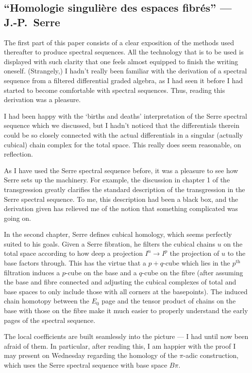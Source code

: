 \documentclass[11pt]{article}
\newcommand{\KanSemResponse}[1]
{
\thispagestyle{fancy}
\subsection*{#1}
}
\begin{document}
\begin{SerreHomSingFibSpace}
\KanSemResponse
{``Homologie singuli\`ere des espaces fibr\'es'' --- J.-P.\ Serre}
The first part of this paper consists of a clear exposition of the methods used thereafter to produce spectral sequences. All the technology that is to be used is displayed with such clarity that one feels almost equipped to finish the writing oneself. (Strangely,) I hadn't really been familiar with the derivation of a spectral sequence from a filtered differential graded algebra, as I had seen it before I had started to become comfortable with spectral sequences. Thus, reading this derivation was a pleasure.

I had been happy with the `births and deaths' interpretation of the Serre spectral sequence which we discussed, but I hadn't noticed that the differentials therein could be so closely connected with the actual differentials in a singular (actually cubical) chain complex for the total space. This really does seem reasonable, on reflection.

As I have used the Serre spectral sequence before, it was a pleasure to see how Serre sets up the machinery. For example, the discussion in chapter 1 of the transgression greatly clarifies the standard description of the transgression in the Serre spectral sequence. To me, this description had been a black box, and the derivation given has relieved me of the notion that something complicated was going on.

In the second chapter, Serre defines cubical homology, which seems perfectly suited to his goals. Given a Serre fibration, he filters the cubical chains $u$ on the total space according to how deep a projection $I^n\to I^p$ the projection of $u$ to the base factors through. This has the virtue that a $p+q$-cube which lies in the $p^\text{th}$ filtration induces a $p$-cube on the base and a $q$-cube on the fibre (after assuming the base and fibre connected and adjusting the cubical complexes of total and base spaces to only include those with all corners at the basepoints). The induced chain homotopy between the $E_0$ page and the tensor product of chains on the base with those on the fibre make it much easier to properly understand the early pages of the spectral sequence.

The local coefficients are built seamlessly into the picture --- I had until now been afraid of them. In particular, after reading this, I am happier with the proof I may present on Wednesday regarding the homology of the $\pi$-adic construction, which uses the Serre spectral sequence with base space $B\pi$.


\end{SerreHomSingFibSpace}
\end{document}
